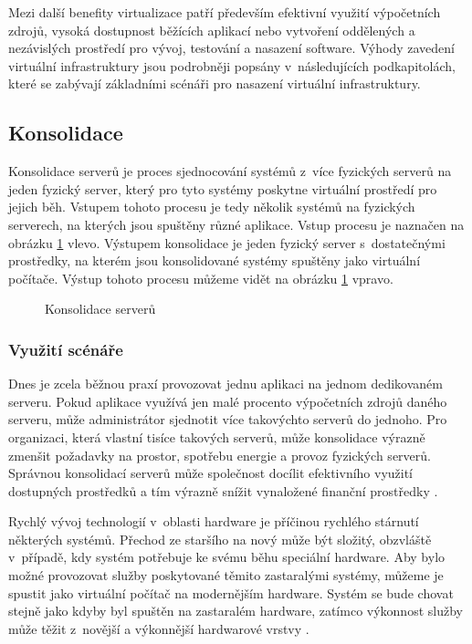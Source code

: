 Mezi další benefity virtualizace patří především efektivní využití výpočetních zdrojů, vysoká dostupnost běžících aplikací nebo
vytvoření oddělených a nezávislých prostředí pro vývoj, testování a nasazení software. Výhody zavedení virtuální infrastruktury
jsou podrobněji popsány v~následujících podkapitolách, které se zabývají základními scénáři pro nasazení virtuální infrastruktury.
\subsection{Konsolidace}
\label{chapter:virtualization:deployment:consolidation}
Konsolidace serverů je proces sjednocování systémů z~více fyzických serverů na jeden fyzický server, který pro tyto systémy
poskytne virtuální prostředí pro jejich běh. Vstupem tohoto procesu je tedy několik systémů na fyzických serverech, na kterých
jsou spuštěny různé aplikace. Vstup procesu je naznačen na obrázku \ref{figure:consolidation_img} vlevo. Výstupem konsolidace
je jeden fyzický server s~dostatečnými prostředky, na kterém jsou konsolidované systémy spuštěny jako virtuální počítače.
Výstup tohoto procesu můžeme vidět na obrázku \ref{figure:consolidation_img} vpravo.
\begin{figure}
    \centering    
    \caption{Konsolidace serverů}
    \label{figure:consolidation_img}
\end{figure}

\subsubsection{Využití scénáře}
\label{chapter:virtualization:deployment:consolidation:use}
Dnes je zcela běžnou praxí provozovat jednu aplikaci na jednom dedikovaném serveru. Pokud aplikace využívá jen malé procento
výpočetních zdrojů daného serveru, může administrátor sjednotit více takovýchto serverů do jednoho. Pro organizaci, která vlastní
tisíce takových serverů, může konsolidace výrazně zmenšit požadavky na prostor, spotřebu energie a provoz fyzických serverů.
Správnou konsolidací serverů může společnost docílit efektivního využití dostupných prostředků a tím výrazně snížit vynaložené
finanční prostředky \cite{oracle:virtualization:reasons}.

Rychlý vývoj technologií v~oblasti hardware je příčinou rychlého stárnutí některých systémů. Přechod ze staršího na nový může
být složitý, obzvláště v~případě, kdy systém potřebuje ke svému běhu speciální hardware. Aby bylo možné provozovat služby poskytované
těmito zastaralými systémy, můžeme je spustit jako virtuální počítač na modernějším hardware. Systém se bude chovat stejně jako
kdyby byl spuštěn na zastaralém hardware, zatímco výkonnost služby může těžit z~novější a výkonnější hardwarové vrstvy
\cite{oracle:virtualization:reasons}.
